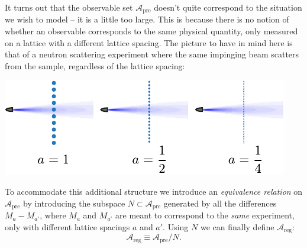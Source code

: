\documentclass[11pt]{amsart}
\theoremstyle{plain}%
\theoremstyle{definition}
\theoremstyle{remark}
\begin{document}
It turns out that the observable set $\mathcal{A}_{\text{pre}}$ doesn't quite correspond to the situation we wish to model -- it is a little too large. This is because there is no notion of whether an observable corresponds to the same physical quantity, only measured on a lattice with a different lattice spacing. The picture to have in mind here is that of a neutron scattering experiment where the same impinging beam scatters from the sample, regardless of the lattice spacing: 
\begin{center}
	\includegraphics{decreasea.pdf}
\end{center}
To accommodate this additional structure we introduce an \emph{equivalence relation} on $\mathcal{A}_{\text{pre}}$ by introducing the subspace $N \subset \mathcal{A}_{\text{pre}}$ generated by all the differences $M_{a}-M_{a'}$, where $M_{a}$ and $M_{a'}$ are meant to correspond to the \emph{same} experiment, only with different lattice spacings $a$ and $a'$. Using $N$ we can finally define $\mathcal{A}_{\text{reg}}$:
\begin{equation}
	\mathcal{A}_{\text{reg}} \equiv \mathcal{A}_{\text{pre}}/N.
\end{equation}
\end{document}
